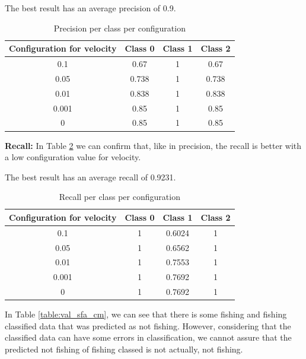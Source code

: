 The best result has an average precision of 0.9.


\begin {table}[H]
\caption {Precision per class per configuration}
\begin{center}
\begin{tabular}{c|c|c|c}
Configuration for velocity & \textbf{Class 0} & \textbf{Class 1} & \textbf{Class 2} \\\hline
0.1 & 0.67 & 1 & 0.67 \\
0.05 & 0.738 & 1 & 0.738 \\
0.01 & 0.838 & 1 & 0.838 \\
0.001 & 0.85 & 1 & 0.85 \\
0 & 0.85 & 1 & 0.85 
\label{table:val_sfa_pr}
\end{tabular}
\end{center}
\end {table}


\textbf{Recall:} %
In Table \ref{table:val_sfa_re} we can confirm that, like in precision, the recall is better with a low configuration value for velocity.

The best result has an average recall of 0.9231.

\begin {table}[H]
\caption {Recall per class per configuration}
\begin{center}
\begin{tabular}{c|c|c|c}
Configuration for velocity & \textbf{Class 0} & \textbf{Class 1} & \textbf{Class 2} \\\hline
0.1 & 1 & 0.6024 & 1 \\
0.05 & 1 & 0.6562 & 1 \\
0.01 & 1 & 0.7553 & 1 \\
0.001 &1 & 0.7692 & 1 \\
0 &1 & 0.7692 & 1
\label{table:val_sfa_re}
\end{tabular}
\end{center}
\end {table}

In Table \ref{table:val_sfa_cm}, we can see that there is some fishing and fishing classified data that was predicted as not fishing. However, considering that the classified data can have some errors in classification, we cannot assure that the predicted not fishing of fishing classed is not actually, not fishing. 

